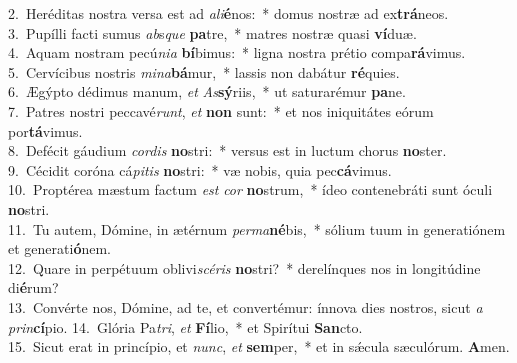 {2.~}Heréditas nostra versa est ad \textit{a}\textit{li}\textbf{é}nos:~* domus nostræ ad ex\textbf{trá}neos.\\
{3.~}Pupílli facti sumus \textit{ab}s\textit{que} \textbf{pa}tre,~* matres nostræ quasi \textbf{ví}duæ.\\
{4.~}Aquam nostram pecú\textit{ni}\textit{a} \textbf{bí}bimus:~* ligna nostra prétio compa\textbf{rá}vimus.\\
{5.~}Cervícibus nostris \textit{mi}\textit{na}\textbf{bá}mur,~* lassis non dabátur \textbf{ré}quies.\\
{6.~}Ægýpto dédimus manum, \textit{et} \textit{As}\textbf{sý}riis,~* ut saturarémur \textbf{pa}ne.\\
{7.~}Patres nostri peccavé\textit{runt}, \textit{et} \textbf{non} sunt:~* et nos iniquitátes eórum por\textbf{tá}vimus.\\
{8.~}Defécit gáudium \textit{cor}\textit{dis} \textbf{no}stri:~* versus est in luctum chorus \textbf{no}ster.\\
{9.~}Cécidit coróna cá\textit{pi}\textit{tis} \textbf{no}stri:~* væ nobis, quia pec\textbf{cá}vimus.\\
{10.~}Proptérea mæstum factum \textit{est} \textit{cor} \textbf{no}strum,~* ídeo contenebráti sunt óculi \textbf{no}stri.\\
{11.~}Tu autem, Dómine, in ætérnum \textit{per}\textit{ma}\textbf{né}bis,~* sólium tuum in generatiónem et generati\textbf{ó}nem.\\
{12.~}Quare in perpétuum oblivi\textit{scé}\textit{ris} \textbf{no}stri?~* derelínques nos in longitúdine di\textbf{é}rum?\\
{13.~}Convérte nos, Dómine, ad te, et convertémur: ínnova dies nostros, sicut \textit{a} \textit{prin}\textbf{cí}pio.
{14.~}Glória Pa\textit{tri}, \textit{et} \textbf{Fí}lio,~* et Spirítui \textbf{San}cto.\\
{15.~}Sicut erat in princípio, et \textit{nunc}, \textit{et} \textbf{sem}per,~* et in sǽcula sæculórum. \textbf{A}men.\\
